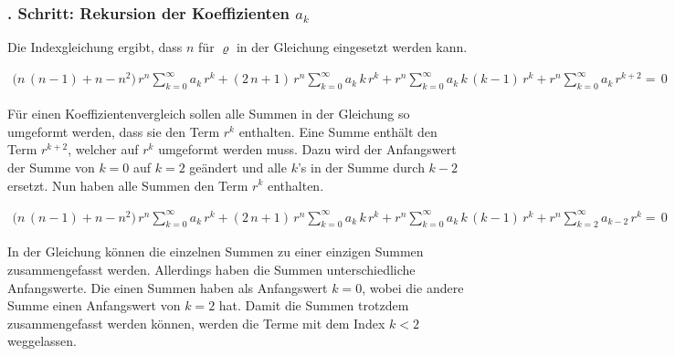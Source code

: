 \subsubsection{. Schritt: Rekursion der Koeffizienten $a_k$}
\begin{normalsize}%
Die Indexgleichung ergibt, dass $n$ f\"ur $\varrho$ in der Gleichung  eingesetzt werden kann.
\end{normalsize}
\begin{align}
	\biggl(
	n \, \left( n - 1 \right)
	+
	n
	-
	n^2
	\biggr)
	\, r^{n}
	\sum_{k=0}^{\infty} a_k \, r^k
	+
	\left(	
	2 \, n
	+
	1
	\right)
	\, r^{n}
	\sum_{k=0}^{\infty} a_k \, k \, r^k
	+
	r^{n}
	\sum_{k=0}^{\infty} a_k \, k \, \left( k - 1 \right) \, r^k
	+
	r^{n}
	\sum_{k=0}^{\infty} a_k \, r^{k + 2}
	= \, 0
	\label{eq:bessel:potenzreihe:dgl:index:eingesetzt}
\end{align}
\begin{normalsize}%
F\"ur einen Koeffizientenvergleich sollen alle Summen in der Gleichung  so umgeformt werden,
dass sie den Term $r^k$ enthalten.
Eine Summe enth\"alt den Term $r^{k + 2}$,
welcher auf $r^k$ umgeformt werden muss.
Dazu wird der Anfangswert der Summe von $k = 0$ auf $k = 2$ ge\"andert und alle $k$'s in der Summe durch $k - 2$ ersetzt.
Nun haben alle Summen den Term $r^k$ enthalten.
\end{normalsize}
\begin{align}
	\biggl(
	n \, \left( n - 1 \right)
	+
	n
	-
	n^2
	\biggr)
	\, r^{n}
	\sum_{k=0}^{\infty} a_k \, r^k
	+
	\left(	
	2 \, n
	+
	1
	\right)
	\, r^{n}
	\sum_{k=0}^{\infty} a_k \, k \, r^k
	+
	r^{n}
	\sum_{k=0}^{\infty} a_k \, k \, \left( k - 1 \right) \, r^k
	+
	r^{n}
	\sum_{k=2}^{\infty} a_{k - 2} \, r^k
	= \, 0
	\label{eq:bessel:potenzreihe:dgl:index:eingesetzt:gleichesummen}
\end{align}
\begin{normalsize}%
In der Gleichung  k\"onnen die einzelnen Summen zu einer einzigen Summen zusammengefasst werden.
Allerdings haben die Summen unterschiedliche Anfangswerte.
Die einen Summen haben als Anfangswert $k = 0$,
wobei die andere Summe einen Anfangswert von $k = 2$ hat.
Damit die Summen trotzdem zusammengefasst werden k\"onnen,
werden die Terme mit dem Index $k < 2$ weggelassen.
\end{normalsize}
